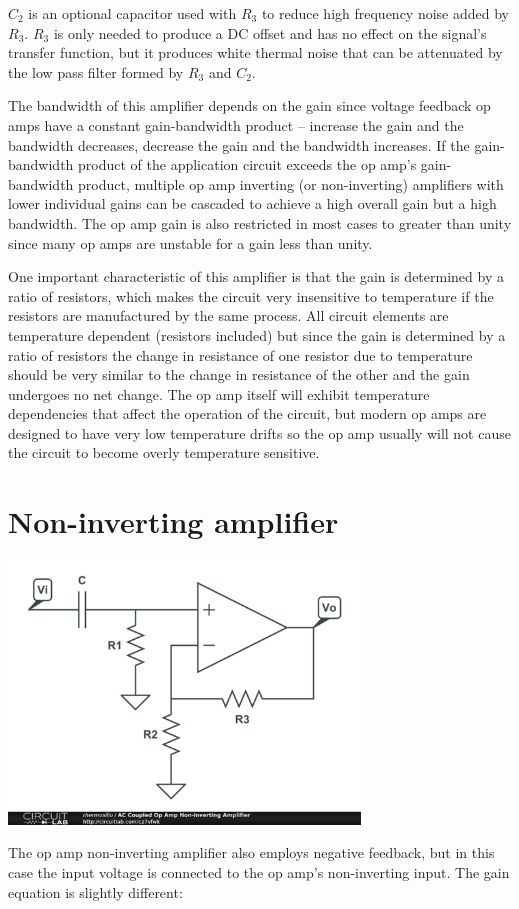 $C_{2}$ is an optional capacitor used with $R_{3}$ to reduce high frequency noise added by $R_{3}$. $R_{3}$ is only needed to produce a DC offset and has no effect on the signal's transfer function, but it produces white thermal noise that can be attenuated by the low pass filter formed by $R_{3}$ and $C_{2}$.
\par The bandwidth of this amplifier depends on the gain since voltage feedback op amps have a constant gain-bandwidth product -- increase the gain and the bandwidth decreases, decrease the gain and the bandwidth increases. If the gain-bandwidth product of the application circuit exceeds the op amp's gain-bandwidth product, multiple op amp inverting (or non-inverting) amplifiers with lower individual gains can be cascaded to achieve a high overall gain but a high bandwidth. The op amp gain is also restricted in most cases to greater than unity since many op amps are unstable for a gain less than unity.
\par One important characteristic of this amplifier is that the gain is determined by a ratio of resistors, which makes the circuit very insensitive to temperature if the resistors are manufactured by the same process. All circuit elements are temperature dependent (resistors included) but since the gain is determined by a ratio of resistors the change in resistance of one resistor due to temperature should be very similar to the change in resistance of the other and the gain undergoes no net change. The op amp itself will exhibit temperature dependencies that affect the operation of the circuit, but modern op amps are designed to have very low temperature drifts so the op amp usually will not cause the circuit to become overly temperature sensitive.

\section{Non-inverting amplifier}
\begin{center}
\includegraphics[width=0.70\textwidth]{schematics/noninvertingopampamplifier.PNG}
\end{center}
The op amp non-inverting amplifier also employs negative feedback, but in this case the input voltage is connected to the op amp's non-inverting input. The gain equation is slightly different:

